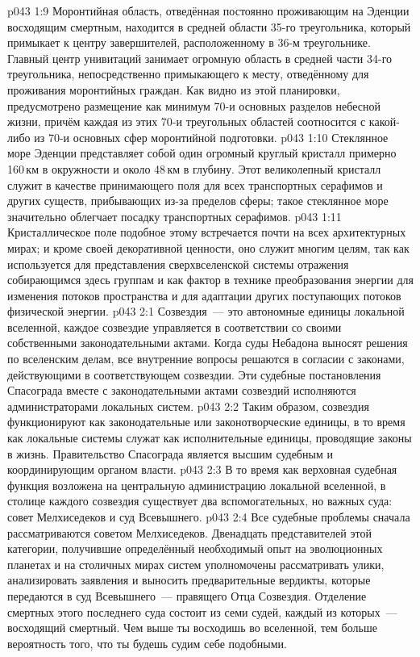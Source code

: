 \vs p043 1:9 Моронтийная область, отведённая постоянно проживающим на Эденции восходящим смертным, находится в средней области 35-го треугольника, который примыкает к центру завершителей, расположенному в 36-м треугольнике. Главный центр унивитаций занимает огромную область в средней части 34-го треугольника, непосредственно примыкающего к месту, отведённому для проживания моронтийных граждан. Как видно из этой планировки, предусмотрено размещение как минимум 70-и основных разделов небесной жизни, причём каждая из этих 70-и треугольных областей соотносится с какой\hyp{}либо из 70-и основных сфер моронтийной подготовки.
\vs p043 1:10 Стеклянное море Эденции представляет собой один огромный круглый кристалл примерно 160\,км в окружности и около 48\,км в глубину. Этот великолепный кристалл служит в качестве принимающего поля для всех транспортных серафимов и других существ, прибывающих из-за пределов сферы; такое стеклянное море значительно облегчает посадку транспортных серафимов.
\vs p043 1:11 Кристаллическое поле подобное этому встречается почти на всех архитектурных мирах; и кроме своей декоративной ценности, оно служит многим целям, так как используется для представления сверхвселенской системы отражения собирающимся здесь группам и как фактор в технике преобразования энергии для изменения потоков пространства и для адаптации других поступающих потоков физической энергии.
\vs p043 2:1 Созвездия~--- это автономные единицы локальной вселенной, каждое созвездие управляется в соответствии со своими собственными законодательными актами. Когда суды Небадона выносят решения по вселенским делам, все внутренние вопросы решаются в согласии с законами, действующими в соответствующем созвездии. Эти судебные постановления Спасограда вместе с законодательными актами созвездий исполняются администраторами локальных систем.
\vs p043 2:2 Таким образом, созвездия функционируют как законодательные или законотворческие единицы, в то время как локальные системы служат как исполнительные единицы, проводящие законы в жизнь. Правительство Спасограда является высшим судебным и координирующим органом власти.
\vs p043 2:3 \pc В то время как верховная судебная функция возложена на центральную администрацию локальной вселенной, в столице каждого созвездия существует два вспомогательных, но важных суда: совет Мелхиседеков и суд Всевышнего.
\vs p043 2:4 Все судебные проблемы сначала рассматриваются советом Мелхиседеков. Двенадцать представителей этой категории, получившие определённый необходимый опыт на эволюционных планетах и на столичных мирах систем уполномочены рассматривать улики, анализировать заявления и выносить предварительные вердикты, которые передаются в суд Всевышнего~--- правящего Отца Созвездия. Отделение смертных этого последнего суда состоит из семи судей, каждый из которых~--- восходящий смертный. Чем выше ты восходишь во вселенной, тем больше вероятность того, что ты будешь судим себе подобными.
